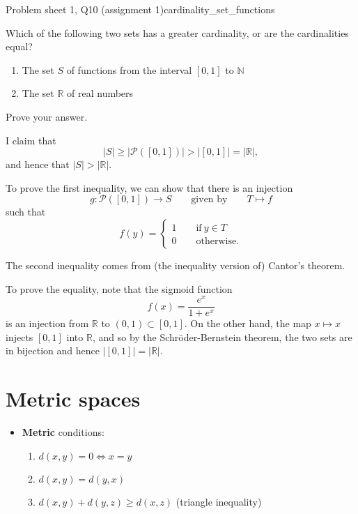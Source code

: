 \begin{problem}{Problem sheet 1, Q10 (assignment 1)}{cardinality_set_functions}
    

    Which of the following two sets has a greater cardinality, or are the cardinalities equal?

    \begin{enumerate}
        \item The set $S$ of functions from the interval $[0, 1]$ to $\mathbb{N}$
        \item The set $\mathbb{R}$ of real numbers
    \end{enumerate}

    Prove your answer.

    \tcblower

    I claim that
        $$ \lvert S \rvert
            \geq \lvert \mathcal{P}([0, 1]) \rvert
            > \lvert [0, 1] \rvert
            = \lvert \mathbb{R} \rvert , $$
    and hence that $\lvert S \rvert > \lvert \mathbb{R} \rvert$.

    To prove the first inequality, we can show that there is an injection
        $$ g : \mathcal{P}([0, 1]) \to S 
            \qquad \text{given by} \qquad
            T \mapsto f$$
    such that
        $$ f(y) = 
            \begin{cases}
                1 \qquad \text{if} \ y \in T \\
                0 \qquad \text{otherwise}.
            \end{cases} $$

    The second inequality comes from (the inequality version of) Cantor's theorem.

    To prove the equality, note that the sigmoid function
        $$ f(x) = \frac{e^x}{1 + e^x} $$
    is an injection from $\mathbb{R}$ to $(0, 1) \subset [0, 1]$. On the other hand, the map $x \mapsto x$ injects $[0, 1]$ into $\mathbb{R}$, and so by the Schröder-Bernstein theorem, the two sets are in bijection and hence $\lvert [0, 1] \rvert = \lvert \mathbb{R} \rvert$.

\end{problem}

\section{Metric spaces}

\begin{itemize}
    \item \textbf{Metric} conditions:
        \begin{enumerate}
            \item $d(x, y) = 0 \iff x = y$
            \item $d(x, y) = d(y, x)$
            \item $d(x, y) + d(y, z) \geq d(x, z)$ \quad (triangle inequality)
        \end{enumerate}
\end{itemize}

